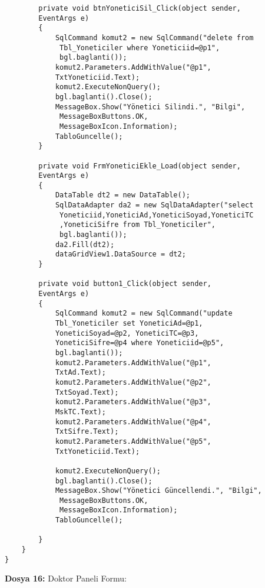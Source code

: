 \begin{lstlisting}
        private void btnYoneticiSil_Click(object sender, 
        EventArgs e)
        {
            SqlCommand komut2 = new SqlCommand("delete from
             Tbl_Yoneticiler where Yoneticiid=@p1", 
             bgl.baglanti());
            komut2.Parameters.AddWithValue("@p1", 
            TxtYoneticiid.Text);
            komut2.ExecuteNonQuery();
            bgl.baglanti().Close();
            MessageBox.Show("Yönetici Silindi.", "Bilgi",
             MessageBoxButtons.OK, 
             MessageBoxIcon.Information);
            TabloGuncelle();
        }

        private void FrmYoneticiEkle_Load(object sender, 
        EventArgs e)
        {
            DataTable dt2 = new DataTable();
            SqlDataAdapter da2 = new SqlDataAdapter("select
             Yoneticiid,YoneticiAd,YoneticiSoyad,YoneticiTC
             ,YoneticiSifre from Tbl_Yoneticiler", 
             bgl.baglanti());
            da2.Fill(dt2);
            dataGridView1.DataSource = dt2;
        }

        private void button1_Click(object sender, 
        EventArgs e)
        {
            SqlCommand komut2 = new SqlCommand("update 
            Tbl_Yoneticiler set YoneticiAd=@p1, 
            YoneticiSoyad=@p2, YoneticiTC=@p3, 
            YoneticiSifre=@p4 where Yoneticiid=@p5", 
            bgl.baglanti());
            komut2.Parameters.AddWithValue("@p1", 
            TxtAd.Text);
            komut2.Parameters.AddWithValue("@p2", 
            TxtSoyad.Text);
            komut2.Parameters.AddWithValue("@p3", 
            MskTC.Text);
            komut2.Parameters.AddWithValue("@p4", 
            TxtSifre.Text);
            komut2.Parameters.AddWithValue("@p5", 
            TxtYoneticiid.Text);

            komut2.ExecuteNonQuery();
            bgl.baglanti().Close();
            MessageBox.Show("Yönetici Güncellendi.", "Bilgi",
             MessageBoxButtons.OK, 
             MessageBoxIcon.Information);
            TabloGuncelle();
           
        }
    }
}
\end{lstlisting}

\textbf{Dosya 16:} Doktor Paneli Formu:

